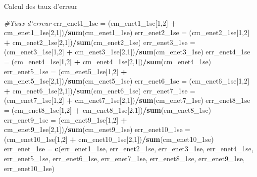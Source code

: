 \documentclass[
]{article}
\newenvironment{Shaded}{\begin{snugshade}}{\end{snugshade}}
\newcommand{\CommentTok}[1]{\textcolor[rgb]{0.56,0.35,0.01}{\textit{#1}}}
\newcommand{\DecValTok}[1]{\textcolor[rgb]{0.00,0.00,0.81}{#1}}
\newcommand{\KeywordTok}[1]{\textcolor[rgb]{0.13,0.29,0.53}{\textbf{#1}}}
\newcommand{\NormalTok}[1]{#1}
\newcommand{\OperatorTok}[1]{\textcolor[rgb]{0.81,0.36,0.00}{\textbf{#1}}}
\newcommand{\StringTok}[1]{\textcolor[rgb]{0.31,0.60,0.02}{#1}}
\begin{document}
Calcul des taux d'erreur

\begin{Shaded}
\begin{Highlighting}[]
\CommentTok{#Taux d'erreur}
\NormalTok{err_enet1_1se =}\StringTok{ }\NormalTok{(cm_enet1_1se[}\DecValTok{1}\NormalTok{,}\DecValTok{2}\NormalTok{] }\OperatorTok{+}\StringTok{ }\NormalTok{cm_enet1_1se[}\DecValTok{2}\NormalTok{,}\DecValTok{1}\NormalTok{])}\OperatorTok{/}\KeywordTok{sum}\NormalTok{(cm_enet1_1se)}
\NormalTok{err_enet2_1se =}\StringTok{ }\NormalTok{(cm_enet2_1se[}\DecValTok{1}\NormalTok{,}\DecValTok{2}\NormalTok{] }\OperatorTok{+}\StringTok{ }\NormalTok{cm_enet2_1se[}\DecValTok{2}\NormalTok{,}\DecValTok{1}\NormalTok{])}\OperatorTok{/}\KeywordTok{sum}\NormalTok{(cm_enet2_1se)}
\NormalTok{err_enet3_1se =}\StringTok{ }\NormalTok{(cm_enet3_1se[}\DecValTok{1}\NormalTok{,}\DecValTok{2}\NormalTok{] }\OperatorTok{+}\StringTok{ }\NormalTok{cm_enet3_1se[}\DecValTok{2}\NormalTok{,}\DecValTok{1}\NormalTok{])}\OperatorTok{/}\KeywordTok{sum}\NormalTok{(cm_enet3_1se)}
\NormalTok{err_enet4_1se =}\StringTok{ }\NormalTok{(cm_enet4_1se[}\DecValTok{1}\NormalTok{,}\DecValTok{2}\NormalTok{] }\OperatorTok{+}\StringTok{ }\NormalTok{cm_enet4_1se[}\DecValTok{2}\NormalTok{,}\DecValTok{1}\NormalTok{])}\OperatorTok{/}\KeywordTok{sum}\NormalTok{(cm_enet4_1se)}
\NormalTok{err_enet5_1se =}\StringTok{ }\NormalTok{(cm_enet5_1se[}\DecValTok{1}\NormalTok{,}\DecValTok{2}\NormalTok{] }\OperatorTok{+}\StringTok{ }\NormalTok{cm_enet5_1se[}\DecValTok{2}\NormalTok{,}\DecValTok{1}\NormalTok{])}\OperatorTok{/}\KeywordTok{sum}\NormalTok{(cm_enet5_1se)}
\NormalTok{err_enet6_1se =}\StringTok{ }\NormalTok{(cm_enet6_1se[}\DecValTok{1}\NormalTok{,}\DecValTok{2}\NormalTok{] }\OperatorTok{+}\StringTok{ }\NormalTok{cm_enet6_1se[}\DecValTok{2}\NormalTok{,}\DecValTok{1}\NormalTok{])}\OperatorTok{/}\KeywordTok{sum}\NormalTok{(cm_enet6_1se)}
\NormalTok{err_enet7_1se =}\StringTok{ }\NormalTok{(cm_enet7_1se[}\DecValTok{1}\NormalTok{,}\DecValTok{2}\NormalTok{] }\OperatorTok{+}\StringTok{ }\NormalTok{cm_enet7_1se[}\DecValTok{2}\NormalTok{,}\DecValTok{1}\NormalTok{])}\OperatorTok{/}\KeywordTok{sum}\NormalTok{(cm_enet7_1se)}
\NormalTok{err_enet8_1se =}\StringTok{ }\NormalTok{(cm_enet8_1se[}\DecValTok{1}\NormalTok{,}\DecValTok{2}\NormalTok{] }\OperatorTok{+}\StringTok{ }\NormalTok{cm_enet8_1se[}\DecValTok{2}\NormalTok{,}\DecValTok{1}\NormalTok{])}\OperatorTok{/}\KeywordTok{sum}\NormalTok{(cm_enet8_1se)}
\NormalTok{err_enet9_1se =}\StringTok{ }\NormalTok{(cm_enet9_1se[}\DecValTok{1}\NormalTok{,}\DecValTok{2}\NormalTok{] }\OperatorTok{+}\StringTok{ }\NormalTok{cm_enet9_1se[}\DecValTok{2}\NormalTok{,}\DecValTok{1}\NormalTok{])}\OperatorTok{/}\KeywordTok{sum}\NormalTok{(cm_enet9_1se)}
\NormalTok{err_enet10_1se =}\StringTok{ }\NormalTok{(cm_enet10_1se[}\DecValTok{1}\NormalTok{,}\DecValTok{2}\NormalTok{] }\OperatorTok{+}\StringTok{ }\NormalTok{cm_enet10_1se[}\DecValTok{2}\NormalTok{,}\DecValTok{1}\NormalTok{])}\OperatorTok{/}\KeywordTok{sum}\NormalTok{(cm_enet10_1se)}
\NormalTok{err_enet_1se =}\StringTok{ }\KeywordTok{c}\NormalTok{(err_enet1_1se, err_enet2_1se, err_enet3_1se, err_enet4_1se, err_enet5_1se, err_enet6_1se, err_enet7_1se, err_enet8_1se, err_enet9_1se, err_enet10_1se)}


\end{Highlighting}
\end{Shaded}
\end{document}
